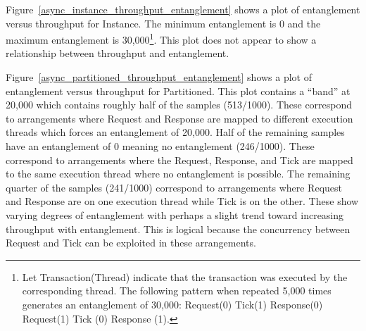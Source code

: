 Figure~\ref{async_instance_throughput_entanglement} shows a plot of entanglement versus throughput for Instance.
The minimum entanglement is 0 and the maximum entanglement is 30,000\footnote{Let Transaction(Thread) indicate that the transaction was executed by the corresponding thread.  The following pattern when repeated 5,000 times generates an entanglement of 30,000:  Request(0) Tick(1) Response(0) Request(1) Tick (0) Response (1).}.
This plot does not appear to show a relationship between throughput and entanglement.

Figure~\ref{async_partitioned_throughput_entanglement} shows a plot of entanglement versus throughput for Partitioned.
This plot contains a ``band'' at 20,000 which contains roughly half of the samples (513/1000).
These correspond to arrangements where Request and Response are mapped to different execution threads which forces an entanglement of 20,000.
Half of the remaining samples have an entanglement of 0 meaning no entanglement (246/1000).
These correspond to arrangements where the Request, Response, and Tick are mapped to the same execution thread where no entanglement is possible.
The remaining quarter of the samples (241/1000) correspond to arrangements where Request and Response are on one execution thread while Tick is on the other.
These show varying degrees of entanglement with perhaps a slight trend toward increasing throughput with entanglement.
This is logical because the concurrency between Request and Tick can be exploited in these arrangements.

